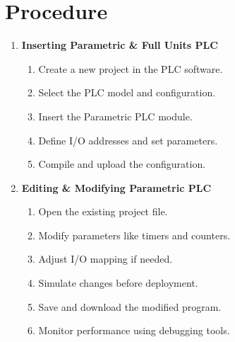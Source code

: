\documentclass[12pt]{article}
\begin{document}
\section*{Procedure}
\begin{enumerate}
    \item \textbf{Inserting Parametric \& Full Units PLC}
          \begin{enumerate}
              \item Create a new project in the PLC software.
              \item Select the PLC model and configuration.
              \item Insert the Parametric PLC module.
              \item Define I/O addresses and set parameters.
              \item Compile and upload the configuration.
          \end{enumerate}
    \item \textbf{Editing \& Modifying Parametric PLC}
          \begin{enumerate}
              \item Open the existing project file.
              \item Modify parameters like timers and counters.
              \item Adjust I/O mapping if needed.
              \item Simulate changes before deployment.
              \item Save and download the modified program.
              \item Monitor performance using debugging tools.
          \end{enumerate}
\end{enumerate}
\end{document}
